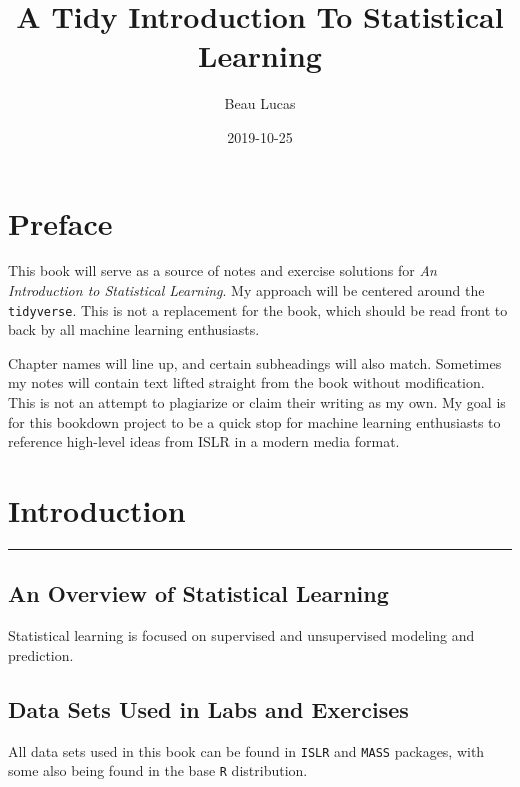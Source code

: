\documentclass[]{book}
\title{A Tidy Introduction To Statistical Learning}
\author{Beau Lucas}
\date{2019-10-25}
\begin{document}
\maketitle

{
\setcounter{tocdepth}{1}
\tableofcontents
}
\hypertarget{preface}{%
\chapter*{Preface}\label{preface}}

This book will serve as a source of notes and exercise solutions for \emph{An Introduction to Statistical Learning}. My approach will be centered around the \texttt{tidyverse}. This is not a replacement for the book, which should be read front to back by all machine learning enthusiasts.

Chapter names will line up, and certain subheadings will also match. Sometimes my notes will contain text lifted straight from the book without modification. This is not an attempt to plagiarize or claim their writing as my own. My goal is for this bookdown project to be a quick stop for machine learning enthusiasts to reference high-level ideas from ISLR in a modern media format.

\hypertarget{intro}{%
\chapter{Introduction}\label{intro}}

\begin{center}\rule{0.5\linewidth}{\linethickness}\end{center}

\hypertarget{an-overview-of-statistical-learning}{%
\section{An Overview of Statistical Learning}\label{an-overview-of-statistical-learning}}

Statistical learning is focused on supervised and unsupervised modeling and prediction.

\hypertarget{data-sets-used-in-labs-and-exercises}{%
\section{Data Sets Used in Labs and Exercises}\label{data-sets-used-in-labs-and-exercises}}

All data sets used in this book can be found in \texttt{ISLR} and \texttt{MASS} packages, with some also being found in the base \texttt{R} distribution.
\end{document}
